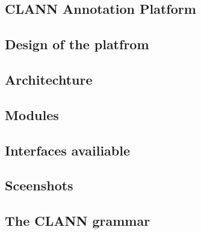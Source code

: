 \subsection{CLANN Annotation Platform}
\subsection{Design of the platfrom}
\subsection{Architechture}
\subsection{Modules}
\subsection{Interfaces availiable}
\subsection{Sceenshots}





\subsection{The CLANN grammar}



